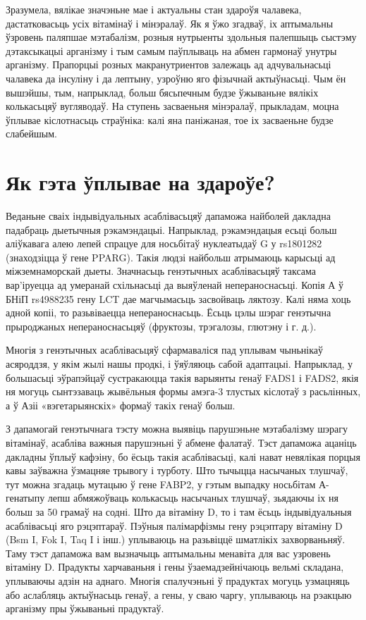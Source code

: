 Зразумела, вялікае значэньне мае і актуальны стан здароўя чалавека, дастатковасьць усіх вітамінаў і мінэралаў. Як я ўжо згадваў, іх аптымальны ўзровень паляпшае мэтабалізм, розныя нутрыенты здольныя палепшыць сыстэму дэтаксыкацыі арганізму і тым самым паўплываць на абмен гармонаў унутры арганізму. Прапорцыі розных макранутриентов залежаць ад адчувальнасьці чалавека да інсуліну і да лептыну, узроўню яго фізычнай актыўнасьці. Чым ён вышэйшы, тым, напрыклад, больш бясьпечным будзе ўжываньне вялікіх колькасьцяў вугляводаў. На ступень засваеньня мінэралаў, прыкладам, моцна ўплывае кіслотнасьць страўніка: калі яна паніжаная, тое іх засваеньне будзе слабейшым.

\section{Як гэта ўплывае на здароўе?}

Веданьне сваіх індывідуальных асаблівасьцяў дапаможа найболей дакладна падабраць дыетычныя рэкамэндацыі. Напрыклад, рэкамэндацыя есьці больш аліўкавага алею лепей спрацуе для носьбітаў нуклеатыдаў G у rs1801282 (знаходзіцца ў гене PPARG). Такія людзі найбольш атрымаюць карысьці ад міжземнаморскай дыеты. Значнасьць генэтычных асаблівасьцяў таксама вар'іруецца ад умеранай схільнасьці да выяўленай непераноснасьці. Копія А ў БНіП rs4988235 гену LCT дае магчымасьць засвойваць ляктозу. Калі няма хоць адной копіі, то разьвіваецца непераноснасьць. Ёсьць цэлы шэраг генэтычна прыроджаных непераноснасьцяў (фруктозы, трэгалозы, глютэну і г. д.).

Многія з генэтычных асаблівасьцяў сфармаваліся пад уплывам чыньнікаў асяроддзя, у якім жылі нашы продкі, і ўяўляюць сабой адаптацыі. Напрыклад, у большасьці эўрапэйцаў сустракаюцца такія варыянты генаў FADS1 і FADS2, якія ня могуць сынтэзаваць жывёльныя формы амэга-3 тлустых кіслотаў з расьлінных, а ў Азіі «вэгетарыянскіх» формаў такіх генаў больш.

З дапамогай генэтычнага тэсту можна выявіць парушэньне мэтабалізму шэрагу вітамінаў, асабліва важныя парушэньні ў абмене фалатаў. Тэст дапаможа ацаніць дакладны ўплыў кафэіну, бо ёсьць такія асаблівасьці, калі нават невялікая порцыя кавы заўважна ўзмацняе трывогу і турботу. Што тычыцца насычаных тлушчаў, тут можна згадаць мутацыю ў гене FABP2, у гэтым выпадку носьбітам А-генатыпу лепш абмяжоўваць колькасьць насычаных тлушчаў, зьядаючы іх ня больш за 50 грамаў на содні. Што да вітаміну D, то і там ёсьць індывідуальныя асаблівасьці яго рэцэптараў. Пэўныя палімарфізмы гену рэцэптару вітаміну D (Bsm I, Fok I, Taq I і інш.) уплываюць на разьвіццё шматлікіх захворваньняў. Таму тэст дапаможа вам вызначыць аптымальны менавіта для вас узровень вітаміну D. Прадукты харчаваньня і гены ўзаемадзейнічаюць вельмі складана, уплываючы адзін на аднаго. Многія спалучэньні ў прадуктах могуць узмацняць або аслабляць актыўнасьць генаў, а гены, у сваю чаргу, уплываюць на рэакцыю арганізму пры ўжываньні прадуктаў.

